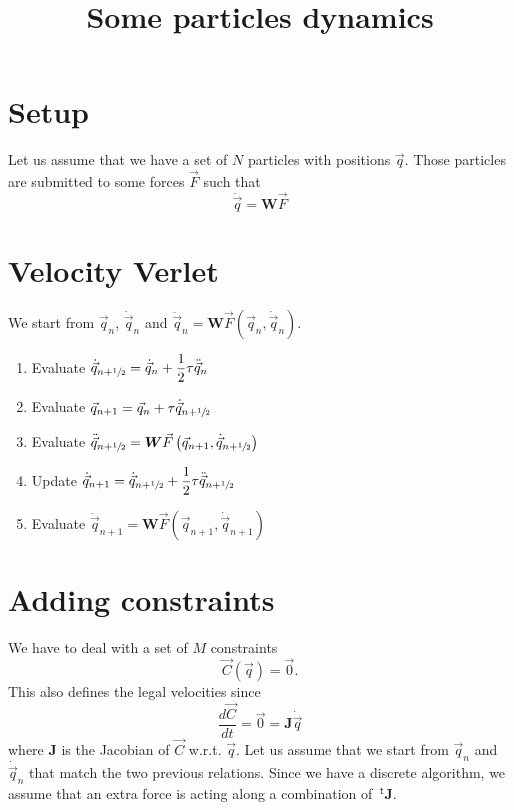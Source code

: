 \documentclass[aps,twocolumn]{revtex4}
\newcommand{\mymat}[1]{\boldsymbol{#1}}
\newcommand{\mytrn}[1]{{\!\!~^{\mathsf{t}}{#1}}}
\newcommand{\half}{\sfrac{1}{2}}
\newcommand{\q}{\vec{q}}
\newcommand{\dq}{\dot{\q}}
\newcommand{\ddq}{\ddot{\q}}
\newcommand{\C}{\vec{C}}
\newcommand{\J}{\mymat{J}}
\newcommand{\W}{\mymat{W}}
\begin{document}
\title{Some particles dynamics}
\maketitle

\section{Setup}

Let us assume that we have a set of $N$ particles with positions $\q$.
Those particles are submitted to some forces $\vec{F}$ such that
\begin{equation}
	\ddq = \W \vec{F}
\end{equation}

\section{Velocity Verlet}
We start from $\q_n$, $\dq_n$ and $\ddq_n         = \W \vec{F}\left(\q_n,\dq_n\right)$.

\begin{enumerate}
\item Evaluate $\dq_{n+\half}  = \dq_n + \dfrac{1}{2}\tau \ddq_n$
\item Evaluate $\q_{n+1} = \q_{n} + \tau \dq_{n+\half}$
\item Evaluate $\ddq_{n+\half} = \W \vec{F}\left(\q_{n+1},\dq_{n+\half}\right)$
\item Update   $\dq_{n+1}      = \dq_{n+\half} + \dfrac{1}{2} \tau \ddq_{n+\half}$
\item Evaluate $\ddq_{n+1}     = \W \vec{F}\left(\q_{n+1},\dq_{n+1}\right)$
\end{enumerate}

\section{Adding constraints}
We have to deal with a set of $M$ constraints 
\begin{equation}
	\C\left(\q\right) = \vec{0}.
\end{equation}
This also defines the legal velocities since
\begin{equation}
\dfrac{d \C}{dt} = \vec{0} = \J \dq
\end{equation}
where $\J$ is the Jacobian of $\C$ w.r.t. $\q$.
Let us assume that we start from $\q_n$ and $\dq_n$ that match the two previous relations.
Since we have a discrete algorithm, we assume that
an extra force is acting along a combination of $\mytrn{\J}$.
\end{document}
